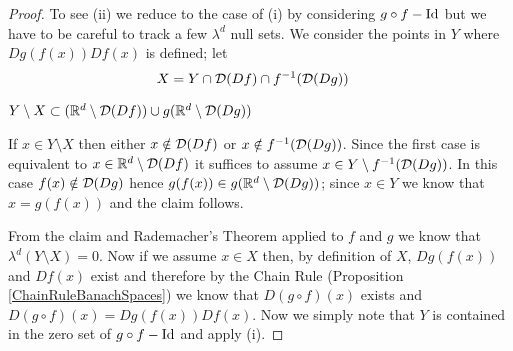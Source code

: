 \begin{proof}
To see (ii) we reduce to the case of (i) by considering $g \circ f - \operatorname*{Id}$ but we have to be careful to track a few $\lambda^d$ null sets.  We consider the points in $Y$ where $Dg(f(x)) Df(x)$ is defined; let
\begin{align*}
X &= Y \cap \mathcal{D}(Df) \cap f^{-1}(\mathcal{D}(Dg))
\end{align*}
\begin{clm}$Y \setminus X \subset (\mathbb{R}^d \setminus \mathcal{D}(Df)) \cup g(\mathbb{R}^d \setminus \mathcal{D}(Dg))$
\end{clm}
If $x \in Y \setminus X$ then either $x \notin \mathcal{D}(Df)$ or $x \notin f^{-1}(\mathcal{D}(Dg))$.  Since the first case is equivalent to $x \in \mathbb{R}^d \setminus \mathcal{D}(Df)$ it suffices to assume 
$x \in Y \setminus f^{-1}(\mathcal{D}(Dg))$.   In this case $f(x) \notin \mathcal{D}(Dg)$ hence $g(f(x)) \in g(\mathbb{R}^d \setminus \mathcal{D}(Dg))$; since $x \in Y$ we know that $x = g(f(x))$ and the claim follows.

From the claim and Rademacher's Theorem applied to $f$ and $g$ we know that $\lambda^d(Y \setminus X) = 0$.  Now if we assume $x \in X$ then, by definition of $X$, $Dg(f(x))$ and $Df(x)$ exist and
therefore by the Chain Rule (Proposition \ref{ChainRuleBanachSpaces}) we know that $D(g \circ f)(x)$ exists and $D(g \circ f)(x) = Dg(f(x)) Df(x)$.  Now we simply note that $Y$ is contained in the zero set of $g \circ f - \operatorname*{Id}$ and apply (i).
\end{proof}

